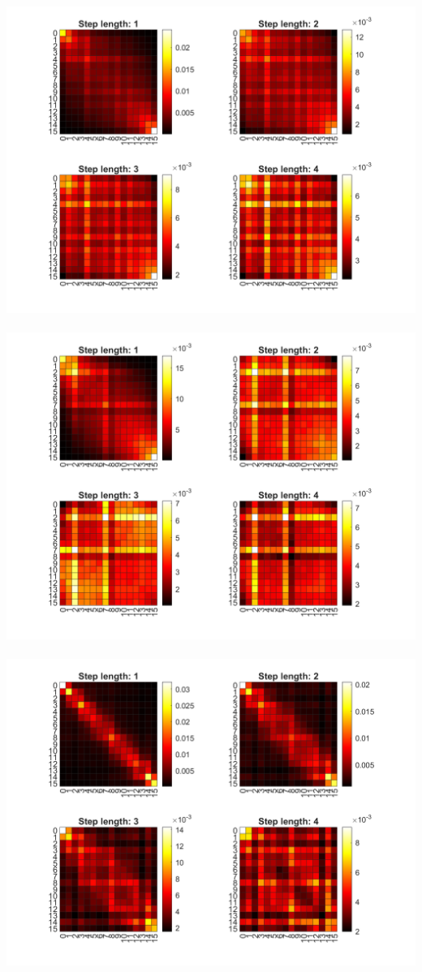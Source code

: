 \documentclass[12pt, letterpaper, twoside]{article}
\begin{document}
\ \\
\includegraphics[scale=0.4]{"glcm4.png"}
\ \\
\includegraphics[scale=0.4]{"glcm5.png"}
\ \\
\includegraphics[scale=0.4]{"glcm6.png"}
\end{document}
